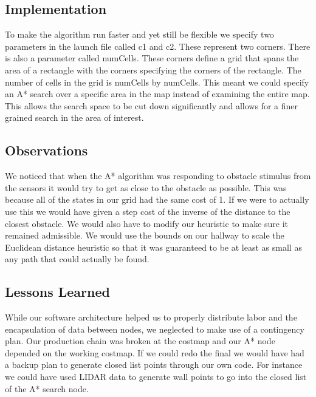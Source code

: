 \subsection{Implementation}
To make the algorithm run faster and yet still be flexible we specify two parameters in the launch file called c1 and c2. These represent two corners. There is also a parameter called numCells. These corners define a grid that spans the area of a rectangle with the corners specifying the corners of the rectangle. The number of cells in the grid is numCells by numCells. This meant we could specify an A* search over a specific area in the map instead of examining the entire map. This allows the search space to be cut down significantly and allows for a finer grained search in the area of interest.

\subsection{Observations}
We noticed that when the A* algorithm was responding to obstacle stimulus from the sensors it would try to get as close to the obstacle as possible. This was because all of the states in our grid had the same cost of 1. If we were to actually use this we would have given a step cost of the inverse of the distance to the closest obstacle. We would also have to modify our heuristic to make sure it remained admissible. We would use the bounds on our hallway to scale the Euclidean distance heuristic so that it was guaranteed to be at least as small as any path that could actually be found.

\subsection{Lessons Learned}
While our software architecture helped us to properly distribute labor and the encapsulation of data between nodes,
we neglected to make use of a contingency plan. Our production chain was broken at the costmap and our A* node depended
on the working costmap. If we could redo the final we would have had a backup plan to generate closed list points
through our own code. For instance we could have used LIDAR data to generate wall points to go into the closed list of the A* search node.
